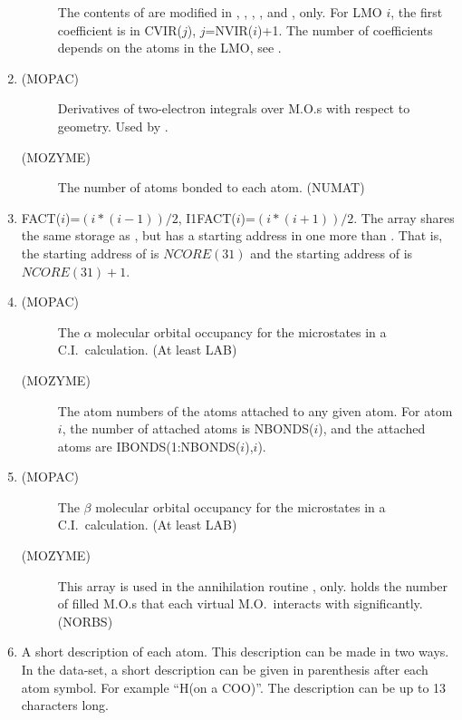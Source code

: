\begin{enumerate}
\begin{description}
The contents of  are modified in , ,
, , and , only. For LMO $i$, the first
coefficient is in CVIR($j$), $j$=NVIR($i$)+1.  The number of coefficients
depends on the atoms in the LMO, see .
\end{description}
\item 
\begin{description}
\item[(MOPAC) ] Derivatives of two-electron integrals 
over M.O.s with respect to geometry.  Used by .
\item[(MOZYME) ] The number of atoms bonded to each atom. (NUMAT)
\end{description}
\item {} FACT($i$)=$(i*(i-1))/2$, I1FACT($i$)=$(i*(i+1))/2$.
The array  shares the same storage as , but has a
starting address in  one more than .  That is, the
starting address of  is $NCORE(31)$ and the starting address of
 is  $NCORE(31)+1$.
\item 
\begin{description}
\item[(MOPAC) ] The $\alpha$ molecular orbital occupancy for the 
microstates in a C.I.\ calculation. (At least LAB) 
\item[(MOZYME) ] The atom numbers of the atoms attached to any
given atom.  For atom $i$, the number of attached atoms is NBONDS($i$), and
the  attached atoms are IBONDS(1:NBONDS($i$),$i$).
\end{description}
\item 
\begin{description}
\item[(MOPAC) ] The $\beta$ molecular orbital occupancy for the 
microstates in a C.I.\ calculation. (At least LAB) 
\item[(MOZYME) ] This array is used in the annihilation routine 
, only.  holds the number of filled M.O.s that each
virtual M.O.\ interacts with significantly. (NORBS)
\end{description}
\item {} A short description of each atom.  This description can be
made in two ways.  In the data-set, a short description can be given in
parenthesis after each atom symbol.  For example ``H(on a COO)''.  The
description can be up to 13 characters long.


\end{enumerate}
